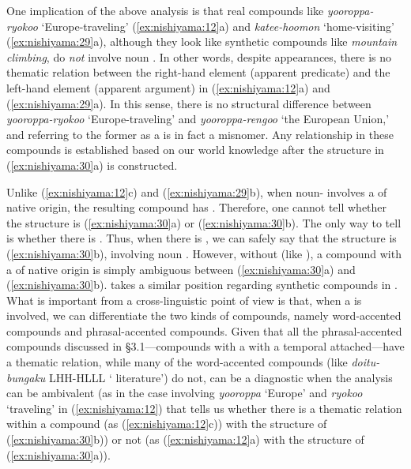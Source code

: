 \documentclass[output=paper]{LSP/langsci}
\begin{document}
One implication of the above analysis is that real compounds like \textit{yooroppa-ryokoo} ‘Europe-traveling’ (\ref{ex:nishiyama:12}a) and \textit{katee-hoomon} ‘home-visiting’ (\ref{ex:nishiyama:29}a), although they look like synthetic compounds like \textit{mountain climbing}, do \textit{not} involve noun . In other words, despite appearances, there is no thematic relation between the right-hand element (apparent predicate) and the left-hand element (apparent argument) in (\ref{ex:nishiyama:12}a) and (\ref{ex:nishiyama:29}a). In this sense, there is no structural difference between \textit{yooroppa-ryokoo} ‘Europe-traveling’ and \textit{yooroppa-rengoo} ‘the European Union,’ and referring to the former as a  is in fact a misnomer. Any relationship in these compounds is established based on our world knowledge after the structure in (\ref{ex:nishiyama:30}a) is constructed.

Unlike (\ref{ex:nishiyama:12}c) and (\ref{ex:nishiyama:29}b), when noun- involves a  of native origin, the resulting compound has . Therefore, one cannot tell whether the structure is (\ref{ex:nishiyama:30}a) or (\ref{ex:nishiyama:30}b). The only way to tell is whether there is  . Thus, when there is  , we can safely say that the structure is (\ref{ex:nishiyama:30}b), involving noun . However, without   (like ), a compound with a  of native origin is simply ambiguous between (\ref{ex:nishiyama:30}a) and (\ref{ex:nishiyama:30}b). \citet{Wiese2008} takes a similar position regarding synthetic compounds in . What is important from a cross-linguistic point of view is that, when a   is involved, we can differentiate the two kinds of compounds, namely word-accented compounds and phrasal-accented compounds. Given that all the phrasal-accented compounds discussed in §3.1—compounds with a   with a temporal  attached—have a thematic relation, while many of the word-accented compounds (like \textit{doitu-bungaku} LHH-HLLL ‘ literature’) do not,  can be a diagnostic when the analysis can be ambivalent (as in the case involving \textit{yooroppa} ‘Europe’ and \textit{ryokoo} ‘traveling’ in (\ref{ex:nishiyama:12}) that tells us whether there is a thematic relation within a compound (as (\ref{ex:nishiyama:12}c)) with the structure of (\ref{ex:nishiyama:30}b)) or not (as (\ref{ex:nishiyama:12}a) with the structure of (\ref{ex:nishiyama:30}a)).
\end{document}
